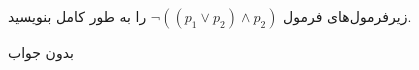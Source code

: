 زیرفرمول‌های فرمول
$\neg((p_1\vee p_2)\wedge p_2)$
را به طور کامل بنویسید.
\begin{ans}
بدون جواب
\end{ans}
